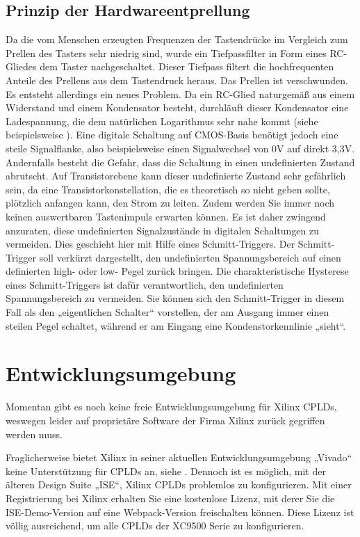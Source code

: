 \documentclass{article}
\begin{document}
\subsection{Prinzip der Hardwareentprellung}
Da die vom Menschen erzeugten Frequenzen der Tastendrücke im Vergleich zum Prellen des Tasters sehr niedrig sind, wurde ein Tiefpassfilter in Form eines RC-Gliedes dem Taster nachgeschaltet. 
Dieser Tiefpass filtert die hochfrequenten Anteile des Prellens aus dem Tastendruck heraus. Das Prellen ist verschwunden. Es entsteht allerdings ein neues Problem. Da ein RC-Glied naturgemäß aus einem Widerstand und einem Kondensator besteht, durchläuft dieser Kondensator eine Ladespannung, die dem natürlichen Logarithmus sehr nahe kommt (siehe beispielsweise \autocite{RC}). Eine digitale Schaltung auf CMOS-Basis benötigt jedoch eine steile Signalflanke, also beispielsweise einen Signalwechsel von 0V auf direkt 3,3V. Andernfalls besteht die Gefahr, dass die Schaltung in einen undefinierten Zustand abrutscht. Auf Transistorebene kann dieser undefinierte Zustand sehr gefährlich sein, da eine Transistorkonstellation, die es theoretisch so nicht geben sollte, plötzlich anfangen kann, den Strom zu leiten. Zudem werden Sie immer noch keinen auswertbaren Tastenimpuls erwarten können. Es ist daher zwingend anzuraten, diese undefinierten Signalzustände in digitalen Schaltungen zu vermeiden. Dies geschieht hier mit Hilfe eines Schmitt-Triggers. Der Schmitt-Trigger soll verkürzt dargestellt, den undefinierten Spannungsbereich auf einen definierten high- oder low- Pegel zurück bringen. Die charakteristische Hysterese eines Schmitt-Triggers ist dafür verantwortlich, den undefinierten Spannungsbereich zu vermeiden. Sie können sich den Schmitt-Trigger in diesem Fall als den „eigentlichen Schalter“ vorstellen, der am Ausgang immer einen steilen Pegel schaltet, während er am Eingang eine Kondenstorkennlinie „sieht“.


\section{Entwicklungsumgebung}

Momentan gibt es noch keine freie \autocite{FSF} Entwicklungsumgebung für Xilinx CPLDs, weswegen leider auf proprietäre Software der Firma Xilinx zurück gegriffen werden muss.
 
Fraglicherweise bietet Xilinx in seiner aktuellen Entwicklungsumgebung „Vivado“ keine Unterstützung für CPLDs an, siehe \autocite[17]{Vivado}. Dennoch ist es möglich, mit der älteren Design Suite „ISE“, Xilinx CPLDs problemlos zu konfigurieren.
Mit einer Registrierung bei Xilinx erhalten Sie eine kostenlose Lizenz, mit derer Sie die ISE-Demo-Version auf eine Webpack-Version \autocite{ISE-Web} freischalten können. Diese Lizenz ist völlig ausreichend, um alle CPLDs der XC9500 Serie zu konfigurieren.
\end{document}
